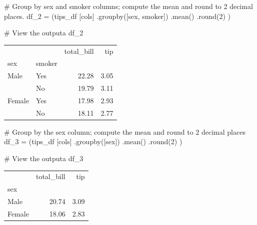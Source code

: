 \documentclass[
  letterpaper,
  DIV=11,
  numbers=noendperiod]{scrartcl}
\newenvironment{Shaded}{\begin{snugshade}}{\end{snugshade}}
\newcommand{\BuiltInTok}[1]{\textcolor[rgb]{0.00,0.46,0.62}{#1}}
\newcommand{\CommentTok}[1]{\textcolor[rgb]{0.37,0.37,0.37}{#1}}
\newcommand{\DecValTok}[1]{\textcolor[rgb]{0.68,0.00,0.00}{#1}}
\newcommand{\NormalTok}[1]{\textcolor[rgb]{0.00,0.46,0.62}{#1}}
\newcommand{\OperatorTok}[1]{\textcolor[rgb]{0.37,0.37,0.37}{#1}}
\newcommand{\StringTok}[1]{\textcolor[rgb]{0.13,0.47,0.30}{#1}}
\begin{document}
\begin{Shaded}
\begin{Highlighting}[]
\CommentTok{\# Group by sex and smoker columns; compute the mean and round to 2 decimal places.}
\NormalTok{df\_2 }\OperatorTok{=}\NormalTok{ (tips\_df}
\NormalTok{        [cols]}
\NormalTok{        .groupby([}\StringTok{\textquotesingle{}sex\textquotesingle{}}\NormalTok{, }\StringTok{\textquotesingle{}smoker\textquotesingle{}}\NormalTok{])}
\NormalTok{        .mean()}
\NormalTok{        .}\BuiltInTok{round}\NormalTok{(}\DecValTok{2}\NormalTok{)}
\NormalTok{)}

\CommentTok{\# View the outputa}
\NormalTok{df\_2}
\end{Highlighting}
\end{Shaded}

\begin{tabular}{llrr}
\toprule
       &    &  total\_bill &   tip \\
sex & smoker &             &       \\
\midrule
Male & Yes &       22.28 &  3.05 \\
       & No &       19.79 &  3.11 \\
Female & Yes &       17.98 &  2.93 \\
       & No &       18.11 &  2.77 \\
\bottomrule
\end{tabular}

\begin{Shaded}
\begin{Highlighting}[]
\CommentTok{\# Group by the sex column; compute the mean and round to 2 decimal places}
\NormalTok{df\_3 }\OperatorTok{=}\NormalTok{ (tips\_df}
\NormalTok{        [cols]}
\NormalTok{        .groupby([}\StringTok{\textquotesingle{}sex\textquotesingle{}}\NormalTok{])}
\NormalTok{        .mean()}
\NormalTok{        .}\BuiltInTok{round}\NormalTok{(}\DecValTok{2}\NormalTok{)}
\NormalTok{)}

\CommentTok{\# View the outputa}
\NormalTok{df\_3}
\end{Highlighting}
\end{Shaded}

\begin{tabular}{lrr}
\toprule
{} &  total\_bill &   tip \\
sex    &             &       \\
\midrule
Male   &       20.74 &  3.09 \\
Female &       18.06 &  2.83 \\
\bottomrule
\end{tabular}
\end{document}
